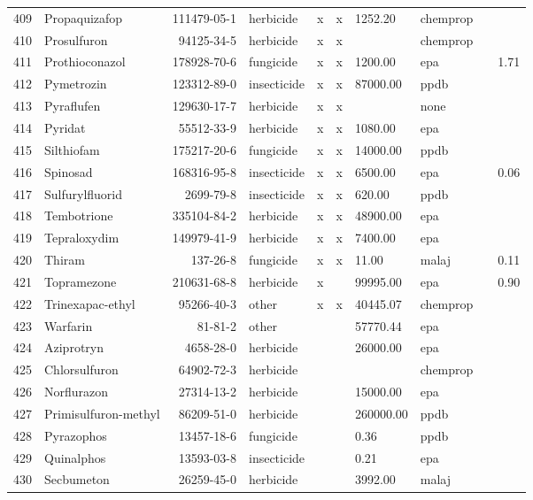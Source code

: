 \begin{longtable}{lp{3cm}rlp{0.5cm}p{0.5cm}p{1.5cm}p{1cm}p{1cm}p{1cm}}
  409 & Propaquizafop & 111479-05-1 & herbicide & x & x & 1252.20 & chemprop &  &  \\ 
  410 & Prosulfuron & 94125-34-5 & herbicide & x & x &  & chemprop &  &  \\ 
  411 & Prothioconazol & 178928-70-6 & fungicide & x & x & 1200.00 & epa &  & 1.71 \\ 
  412 & Pymetrozin & 123312-89-0 & insecticide & x & x & 87000.00 & ppdb &  &  \\ 
  413 & Pyraflufen & 129630-17-7 & herbicide & x & x &  & none &  &  \\ 
  414 & Pyridat & 55512-33-9 & herbicide & x & x & 1080.00 & epa &  &  \\ 
  415 & Silthiofam & 175217-20-6 & fungicide & x & x & 14000.00 & ppdb &  &  \\ 
  416 & Spinosad & 168316-95-8 & insecticide & x & x & 6500.00 & epa &  & 0.06 \\ 
  417 & Sulfurylfluorid & 2699-79-8 & insecticide & x & x & 620.00 & ppdb &  &  \\ 
  418 & Tembotrione & 335104-84-2 & herbicide & x & x & 48900.00 & epa &  &  \\ 
  419 & Tepraloxydim & 149979-41-9 & herbicide & x & x & 7400.00 & epa &  &  \\ 
  420 & Thiram & 137-26-8 & fungicide & x & x & 11.00 & malaj &  & 0.11 \\ 
  421 & Topramezone & 210631-68-8 & herbicide & x &  & 99995.00 & epa &  & 0.90 \\ 
  422 & Trinexapac-ethyl & 95266-40-3 & other & x & x & 40445.07 & chemprop &  &  \\ 
  423 & Warfarin & 81-81-2 & other &  &  & 57770.44 & epa &  &  \\ 
  424 & Aziprotryn & 4658-28-0 & herbicide &  &  & 26000.00 & epa &  &  \\ 
  425 & Chlorsulfuron & 64902-72-3 & herbicide &  &  &  & chemprop &  &  \\ 
  426 & Norflurazon & 27314-13-2 & herbicide &  &  & 15000.00 & epa &  &  \\ 
  427 & Primisulfuron-methyl & 86209-51-0 & herbicide &  &  & 260000.00 & ppdb &  &  \\ 
  428 & Pyrazophos & 13457-18-6 & fungicide &  &  & 0.36 & ppdb &  &  \\ 
  429 & Quinalphos & 13593-03-8 & insecticide &  &  & 0.21 & epa &  &  \\ 
  430 & Secbumeton & 26259-45-0 & herbicide &  &  & 3992.00 & malaj &  &  \\ 

\end{longtable}
